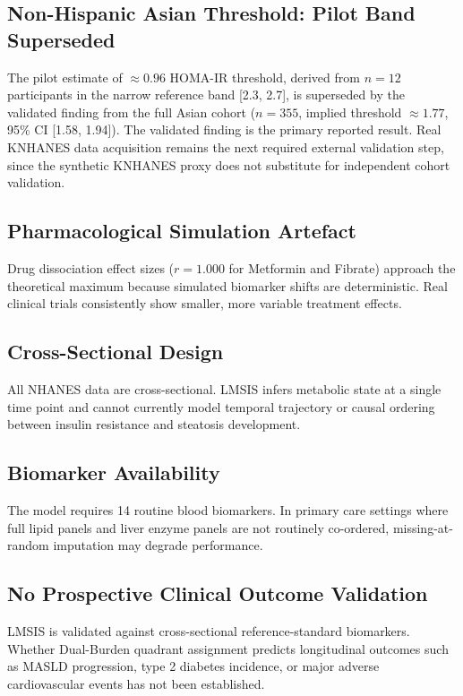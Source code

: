 \documentclass[12pt,a4paper,oneside]{report}
\begin{document}
\subsection{Non-Hispanic Asian Threshold: Pilot Band Superseded}

The pilot estimate of $\approx 0.96$ HOMA-IR threshold, derived from $n = 12$ participants in the narrow reference band [2.3, 2.7], is superseded by the validated finding from the full Asian cohort ($n = 355$, implied threshold $\approx 1.77$, 95\% CI [1.58, 1.94]). The validated finding is the primary reported result. Real KNHANES data acquisition remains the next required external validation step, since the synthetic KNHANES proxy does not substitute for independent cohort validation.

\subsection{Pharmacological Simulation Artefact}

Drug dissociation effect sizes ($r = 1.000$ for Metformin and Fibrate) approach the theoretical maximum because simulated biomarker shifts are deterministic. Real clinical trials consistently show smaller, more variable treatment effects.

\subsection{Cross-Sectional Design}

All NHANES data are cross-sectional. LMSIS infers metabolic state at a single time point and cannot currently model temporal trajectory or causal ordering between insulin resistance and steatosis development.

\subsection{Biomarker Availability}

The model requires 14 routine blood biomarkers. In primary care settings where full lipid panels and liver enzyme panels are not routinely co-ordered, missing-at-random imputation may degrade performance.

\subsection{No Prospective Clinical Outcome Validation}

LMSIS is validated against cross-sectional reference-standard biomarkers. Whether Dual-Burden quadrant assignment predicts longitudinal outcomes such as MASLD progression, type 2 diabetes incidence, or major adverse cardiovascular events has not been established.
\end{document}
